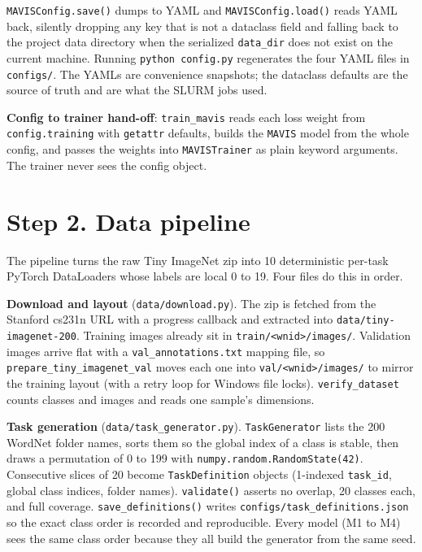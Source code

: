 \documentclass[11pt,a4paper]{article}
\newcommand{\code}[1]{\texttt{#1}}
\begin{document}
\code{MAVISConfig.save()} dumps to YAML and \code{MAVISConfig.load()} reads YAML back, silently dropping any key that is not a dataclass field and falling back to the project data directory when the serialized \code{data\_dir} does not exist on the current machine. Running \code{python config.py} regenerates the four YAML files in \code{configs/}. The YAMLs are convenience snapshots; the dataclass defaults are the source of truth and are what the SLURM jobs used.

\textbf{Config to trainer hand-off}: \code{train\_mavis} reads each loss weight from \code{config.training} with \code{getattr} defaults, builds the \code{MAVIS} model from the whole config, and passes the weights into \code{MAVISTrainer} as plain keyword arguments. The trainer never sees the config object.

\section{Step 2. Data pipeline}

The pipeline turns the raw Tiny ImageNet zip into 10 deterministic per-task PyTorch DataLoaders whose labels are local 0 to 19. Four files do this in order.

\textbf{Download and layout} (\code{data/download.py}). The zip is fetched from the Stanford cs231n URL with a progress callback and extracted into \code{data/tiny-imagenet-200}. Training images already sit in \code{train/<wnid>/images/}. Validation images arrive flat with a \code{val\_annotations.txt} mapping file, so \code{prepare\_tiny\_imagenet\_val} moves each one into \code{val/<wnid>/images/} to mirror the training layout (with a retry loop for Windows file locks). \code{verify\_dataset} counts classes and images and reads one sample's dimensions.

\textbf{Task generation} (\code{data/task\_generator.py}). \code{TaskGenerator} lists the 200 WordNet folder names, sorts them so the global index of a class is stable, then draws a permutation of 0 to 199 with \code{numpy.random.RandomState(42)}. Consecutive slices of 20 become \code{TaskDefinition} objects (1-indexed \code{task\_id}, global class indices, folder names). \code{validate()} asserts no overlap, 20 classes each, and full coverage. \code{save\_definitions()} writes \code{configs/task\_definitions.json} so the exact class order is recorded and reproducible. Every model (M1 to M4) sees the same class order because they all build the generator from the same seed.
\end{document}

